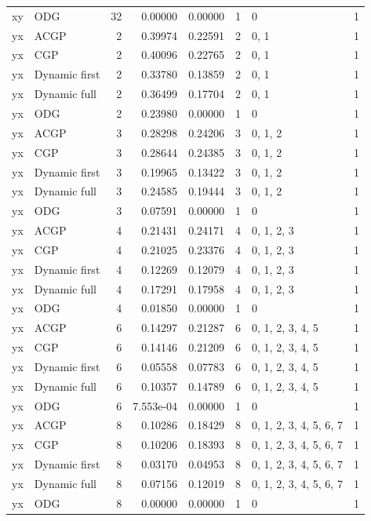 \documentclass[10pt,a4paper]{article}
\begin{document}
\begin{longtable}{@{}p{23mm}p{29mm}rrrrp{36mm}r@{}}
xy & ODG & 32 & 0.00000 & 0.00000 & 1 & 0 & 1 \\
yx & ACGP & 2 & 0.39974 & 0.22591 & 2 & 0, 1 & 1 \\
yx & CGP & 2 & 0.40096 & 0.22765 & 2 & 0, 1 & 1 \\
yx & Dynamic first & 2 & 0.33780 & 0.13859 & 2 & 0, 1 & 1 \\
yx & Dynamic full & 2 & 0.36499 & 0.17704 & 2 & 0, 1 & 1 \\
yx & ODG & 2 & 0.23980 & 0.00000 & 1 & 0 & 1 \\
yx & ACGP & 3 & 0.28298 & 0.24206 & 3 & 0, 1, 2 & 1 \\
yx & CGP & 3 & 0.28644 & 0.24385 & 3 & 0, 1, 2 & 1 \\
yx & Dynamic first & 3 & 0.19965 & 0.13422 & 3 & 0, 1, 2 & 1 \\
yx & Dynamic full & 3 & 0.24585 & 0.19444 & 3 & 0, 1, 2 & 1 \\
yx & ODG & 3 & 0.07591 & 0.00000 & 1 & 0 & 1 \\
yx & ACGP & 4 & 0.21431 & 0.24171 & 4 & 0, 1, 2, 3 & 1 \\
yx & CGP & 4 & 0.21025 & 0.23376 & 4 & 0, 1, 2, 3 & 1 \\
yx & Dynamic first & 4 & 0.12269 & 0.12079 & 4 & 0, 1, 2, 3 & 1 \\
yx & Dynamic full & 4 & 0.17291 & 0.17958 & 4 & 0, 1, 2, 3 & 1 \\
yx & ODG & 4 & 0.01850 & 0.00000 & 1 & 0 & 1 \\
yx & ACGP & 6 & 0.14297 & 0.21287 & 6 & 0, 1, 2, 3, 4, 5 & 1 \\
yx & CGP & 6 & 0.14146 & 0.21209 & 6 & 0, 1, 2, 3, 4, 5 & 1 \\
yx & Dynamic first & 6 & 0.05558 & 0.07783 & 6 & 0, 1, 2, 3, 4, 5 & 1 \\
yx & Dynamic full & 6 & 0.10357 & 0.14789 & 6 & 0, 1, 2, 3, 4, 5 & 1 \\
yx & ODG & 6 & 7.553e-04 & 0.00000 & 1 & 0 & 1 \\
yx & ACGP & 8 & 0.10286 & 0.18429 & 8 & 0, 1, 2, 3, 4, 5, 6, 7 & 1 \\
yx & CGP & 8 & 0.10206 & 0.18393 & 8 & 0, 1, 2, 3, 4, 5, 6, 7 & 1 \\
yx & Dynamic first & 8 & 0.03170 & 0.04953 & 8 & 0, 1, 2, 3, 4, 5, 6, 7 & 1 \\
yx & Dynamic full & 8 & 0.07156 & 0.12019 & 8 & 0, 1, 2, 3, 4, 5, 6, 7 & 1 \\
yx & ODG & 8 & 0.00000 & 0.00000 & 1 & 0 & 1 \\

\end{longtable}
\end{document}
